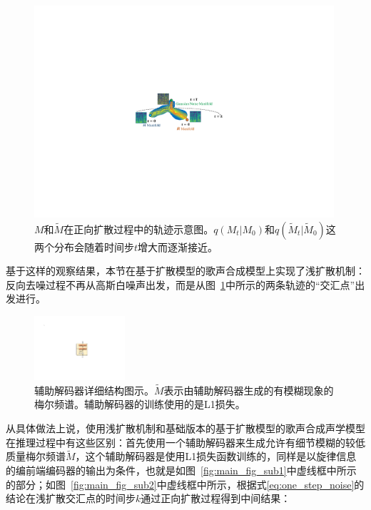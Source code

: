 \begin{figure}[!h]
    \centering
    \includegraphics[width=0.99\textwidth]{figure/svs/manifold.pdf} %
    \caption{$M$和$\widetilde{M}$在正向扩散过程中的轨迹示意图\citep{diffsinger}。$q(M_t| M_0)$和$q(\widetilde{M}_t| \widetilde{M}_0)$这两个分布会随着时间步$t$增大而逐渐接近。}
    \label{fig:manifolds}
\end{figure}
基于这样的观察结果，本节在基于扩散模型的歌声合成模型上实现了浅扩散机制\citep{diffsinger}：反向去噪过程不再从高斯白噪声出发，而是从图~\ref{fig:manifolds}中所示的两条轨迹的``交汇点''出发进行。
\begin{figure}[!h]
	\centering
	\includegraphics[width=0.30\textwidth,clip=true]{figure/svs/auxiliary_decoder.pdf}
	\caption{辅助解码器详细结构图示。$\widetilde{M}$表示由辅助解码器生成的有模糊现象的梅尔频谱。辅助解码器的训练使用的是L1损失。}
	\label{supfig:aux_decoder}
\end{figure}
从具体做法上说，使用浅扩散机制和基础版本的基于扩散模型的歌声合成声学模型在推理过程中有这些区别：首先使用一个辅助解码器来生成允许有细节模糊的较低质量梅尔频谱$\widetilde{M}$，这个辅助解码器是使用L1损失函数训练的，同样是以旋律信息的编前端编码器的输出为条件，也就是如图~\ref{fig:main_fig_sub1}中虚线框中所示的部分；如图~\ref{fig:main_fig_sub2}中虚线框中所示，根据式\eqref{eq:one_step_noise}的结论在浅扩散交汇点的时间步$k$通过正向扩散过程得到中间结果：
